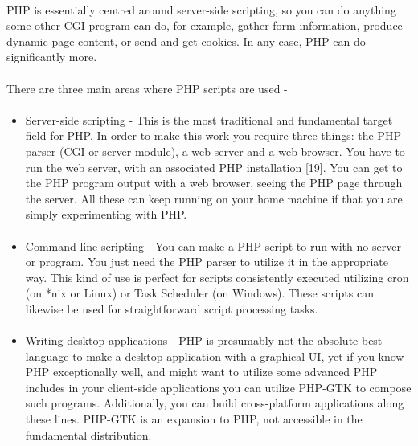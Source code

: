 \documentclass[../thesis.tex]{subfiles}
\begin{document}
\paragraph{}
PHP is essentially centred around server-side scripting, so you can do anything some other CGI program can do, for example, gather form information, produce dynamic page content, or send and get cookies. In any case, PHP can do significantly more.
\paragraph{}
There are three main areas where PHP scripts are used -
\paragraph{}
\begin{itemize}
\item Server-side scripting -  This is the most traditional and fundamental target field for PHP. In order to make this work you require three things: the PHP parser (CGI or server module), a web server and a web browser. You have to run the web server, with an associated PHP installation [19]. You can get to the PHP program output with a web browser, seeing the PHP page through the server. All these can keep running on your home machine if that you are simply experimenting with PHP.
\paragraph{}
\item Command line scripting - You can make a PHP script to run with no server or program. You just need the PHP parser to utilize it in the appropriate way. This kind of use is perfect for scripts consistently executed utilizing cron (on *nix or Linux) or Task Scheduler (on Windows). These scripts can likewise be used for straightforward script processing tasks.
\paragraph{}
\item Writing desktop applications - PHP is presumably not the absolute best language to make a desktop application with a graphical UI, yet if you know PHP exceptionally well, and might want to utilize some advanced PHP includes in your client-side applications you can utilize PHP-GTK to compose such programs. Additionally, you can build cross-platform applications along these lines. PHP-GTK is an expansion to PHP, not accessible in the fundamental distribution.
\end{itemize}
\end{document}
